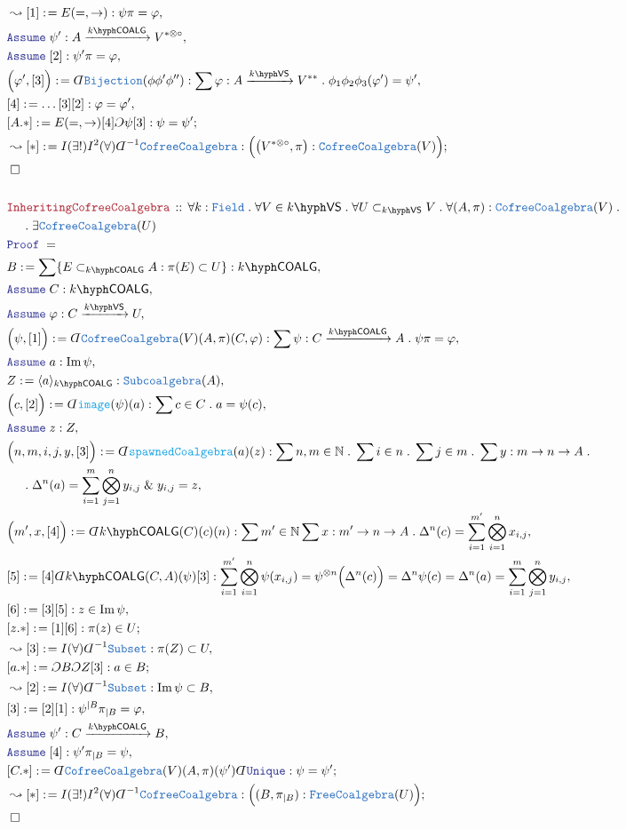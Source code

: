 \documentclass[12pt]{scrartcl}%
\newcommand{\TYPE}[1]{\textcolor{NavyBlue}{\mathtt{#1}}}%
\newcommand{\FUNC}[1]{\textcolor{Cerulean}{\mathtt{#1}}}%
\newcommand{\LOGIC}[1]{\textcolor{Blue}{\mathtt{#1}}}%
\newcommand{\THM}[1]{\textcolor{Maroon}{\mathtt{#1}}}%
\renewcommand{\.}{\; . \;} %
\newcommand{\de}{: \kern 0.1pc =} %
\newcommand{\Theorem}[2]{& \THM{#1} \, :: \, #2 \\ & \Proof = \\ } %
\newcommand{\NewLine}{\\ & \kern 1pc}%
\newcommand{\Page}[1]{ \begin{align*} #1 \end{align*}  }%
\newcommand{ \bd }{ \ByDef }%
\renewcommand{\And}{\; \& \;}%
\newcommand{\Nat}{\mathbb{N}}%
\DeclareMathOperator*{\im}{Im}%
\newcommand{\Say}[3]{& #1 \de #2 : #3, \\} %
\newcommand{\Conclude}[3]{& #1 \de #2 : #3; \\}%
\newcommand{\Derive}[3]{& \leadsto #1 \de #2 : #3, \\} %
\newcommand{\DeriveConclude}[3]{& \leadsto #1 \de #2 : #3 ; \\} %
\newcommand{\Assume}[2]{& \LOGIC{Assume} \; #1 : #2, \\} %
\newcommand{\QED}{\; \square} %
\newcommand{\EndProof}{& \QED \\} %
\newcommand{\ByDef}{\rotatebox[origin=c]{-180}{$D$}}%
\newcommand{\ByConstr}{\rotatebox[origin=c]{-180}{$C$}}%
\newcommand{\Proof}{\LOGIC{Proof} \; } %
\newcommand{\Arrow}[1]{\xrightarrow{#1}}%
\newcommand{\subvec}[1]{\subset_{\VS{#1}}}%
\newcommand{\VS}[1]{#1\hyph\mathsf{VS}} %
\newcommand{\Field}{\TYPE{Field}}
\newcommand{\COALG}[1]{#1\hyph\mathsf{COALG}}%
\begin{document}
\Page{
	\Derive{[1]}{E(=,\to)}{\psi\pi = \varphi}
	\Assume{\psi'}{A \Arrow{\COALG{k}} V^{*\otimes\circ}}
	\Assume{[2]}{\psi'\pi = \varphi}
	\Say{\Big(\varphi',[3]\Big)}{\bd \TYPE{Bijection}(\phi\phi'\phi'')}{\sum \varphi : A \Arrow{\VS{k}} V^{**} \. \phi_1\phi_2\phi_3(\varphi') = \psi'}
	\Say{[4]}{\ldots[3][2]}{ \varphi=\varphi' }
	\Conclude{[A.*]}{ E(=,\to)[4]\ByConstr \psi [3]}{\psi = \psi'} 
	\DeriveConclude{[*]}{I(\exists!)I^2(\forall)\bd^{-1}\TYPE{CofreeCoalgebra}}
	{
		\Big( \big( V^{*\otimes\circ},\pi \big) : \TYPE{CofreeCoalgebra}(V)  \Big)
	}
	\EndProof
	\\
	\Theorem{InheritingCofreeCoalgebra}{
		\forall k : \Field \. 
		\forall V \in \VS{k} \.
		\forall U \subvec{k} V \.
		\forall (A,\pi) : \TYPE{CofreeCoalgebra}(V) \. \NewLine \. 
		\exists \TYPE{CofreeCoalgebra}(U)
	}
	\Say{B}{\sum\{ E \subset_{\COALG{k}} A : \pi(E) \subset U   \}}{\COALG{k}} 
	\Assume{C}{\COALG{k}}
	\Assume{\varphi}{C \Arrow{\VS{k}} U}
	\Say{\Big(\psi,[1]\Big) }{\bd \TYPE{CofreeCoalgebra}(V)(A,\pi)(C,\varphi)}{ \sum \psi : C \Arrow{\COALG{k}} A \. \psi \pi = \varphi}
	\Assume{a}{\im \psi}
	\Say{Z}{\langle a \rangle_{\COALG{k}}}{\TYPE{Subcoalgebra}(A)}
	\Say{\Big(c,[2]\Big)}{ \bd \FUNC{image}(\psi)(a) }{\sum c \in C \. a = \psi(c)}
	\Assume{z}{Z}
	\Say{\Big(n,m,i,j,y,[3]\Big)}{\bd \FUNC{spawnedCoalgebra}(a)(z)}
	{\sum n,m \in \Nat \. \sum i \in n \. \sum j \in m \. \sum  y : m \to n \to A \. \NewLine \.  \Delta^n(a) = \sum^m_{i=1}\bigotimes^n_{j=1} y_{i,j} \And y_{i,j} = z }
	\Say{\Big( m',x, [4]  \Big)}{\bd \COALG{k}(C)(c)(n)}{\sum m' \in \Nat \sum x : m' \to n \to A \. \Delta^n(c) = \sum^{m'}_{i=1} \bigotimes^n_{i=1} x_{i,j}}
	\Say{[5]}{[4]\bd \COALG{k}(C,A)(\psi)[3]}{
		\sum^{m'}_{i=1} \bigotimes^n_{i=1} \psi(x_{i,j}) =
		\psi^{\otimes n}\Big( \Delta^n(c) \Big) =
		\Delta^n \psi(c) = 
		\Delta^n (a) =  
		\sum^m_{i=1} \bigotimes^n_{j=1} y_{i,j}
	}
	\Say{[6]}{[3][5]}{z \in \im \psi}
	\Conclude{[z.*]}{[1][6]}{\pi(z) \in U}
	\Derive{[3]}{I(\forall) \bd^{-1}\TYPE{Subset}}{\pi(Z) \subset U}
	\Conclude{[a.*]}{\ByConstr B \ByConstr Z  [3]}{a \in B}
	\Derive{ [2] }{I(\forall)\bd^{-1}\TYPE{Subset}}{\im \psi \subset B}
	\Say{[3]}{[2][1]}{ \psi^{|B} \pi_{|B} = \varphi }
	\Assume{\psi'}{ C  \Arrow{\COALG{k}} B }
	\Assume{[4]}{\psi' \pi_{|B} = \psi}
	\Conclude{[C.*]}{\bd \TYPE{CofreeCoalgebra}(V)(A,\pi)(\psi')\bd \LOGIC{Unique}}{\psi = \psi'}
	\DeriveConclude{[*]}{I(\exists!)I^2(\forall)\bd^{-1}\TYPE{CofreeCoalgebra}}
	{\Big( (B,\pi_{|B}) : \TYPE{FreeCoalgebra}(U) \Big) }
	\EndProof
}
\end{document}
